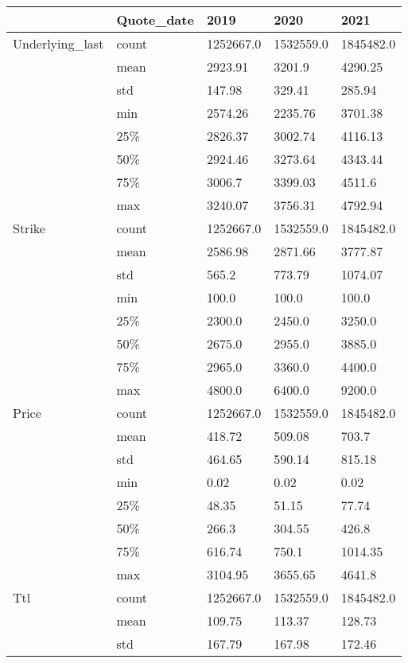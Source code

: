\begin{tabular}{lllll}
\toprule
  & Quote\_date &       2019 &       2020 &       2021 \\
\midrule
Underlying\_last & count &  1252667.0 &  1532559.0 &  1845482.0 \\
  & mean &    2923.91 &     3201.9 &    4290.25 \\
  & std &     147.98 &     329.41 &     285.94 \\
  & min &    2574.26 &    2235.76 &    3701.38 \\
  & 25\% &    2826.37 &    3002.74 &    4116.13 \\
  & 50\% &    2924.46 &    3273.64 &    4343.44 \\
  & 75\% &     3006.7 &    3399.03 &     4511.6 \\
  & max &    3240.07 &    3756.31 &    4792.94 \\
Strike & count &  1252667.0 &  1532559.0 &  1845482.0 \\
  & mean &    2586.98 &    2871.66 &    3777.87 \\
  & std &      565.2 &     773.79 &    1074.07 \\
  & min &      100.0 &      100.0 &      100.0 \\
  & 25\% &     2300.0 &     2450.0 &     3250.0 \\
  & 50\% &     2675.0 &     2955.0 &     3885.0 \\
  & 75\% &     2965.0 &     3360.0 &     4400.0 \\
  & max &     4800.0 &     6400.0 &     9200.0 \\
Price & count &  1252667.0 &  1532559.0 &  1845482.0 \\
  & mean &     418.72 &     509.08 &      703.7 \\
  & std &     464.65 &     590.14 &     815.18 \\
  & min &       0.02 &       0.02 &       0.02 \\
  & 25\% &      48.35 &      51.15 &      77.74 \\
  & 50\% &      266.3 &     304.55 &      426.8 \\
  & 75\% &     616.74 &      750.1 &    1014.35 \\
  & max &    3104.95 &    3655.65 &     4641.8 \\
Ttl & count &  1252667.0 &  1532559.0 &  1845482.0 \\
  & mean &     109.75 &     113.37 &     128.73 \\
  & std &     167.79 &     167.98 &     172.46 \\

\end{tabular}
